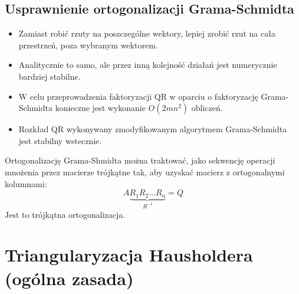 \documentclass[a4paper]{article}
\begin{document}
\subsection{Usprawnienie ortogonalizacji Grama-Schmidta}
\begin{itemize}
    \item Zamiast robić rzuty na poszczególne wektory, lepiej zrobić rzut na cała przestrzeń, poza wybranym wektorem.
    \item Analitycznie to samo, ale przez inną kolejność działań jest numerycznie bardziej stabilne.
    \item W celu przeprowadzenia faktoryzacji QR w oparciu o faktoryzację Grama-Schmidta konieczne jest wykonanie $O(2mn^2)$ obliczeń.
    \item Rozkład QR wykonywany zmodyfikowanym algorytmem Grama-Schmidta jest stabilny wstecznie.
\end{itemize}

Ortogonalizację Grama-Shmidta można traktować, jako sekwencję operacji mnożenia przez macierze trójkątne tak, aby uzyskać macierz z ortogonalnymi kolumnami:
\begin{equation*}
    A \underbrace{R_1R_2 \dots R_n}_{R^{-1}} = Q
\end{equation*}
Jest to trójkątna ortogonalizacja.

\section{Triangularyzacja Hausholdera (ogólna zasada)}
\end{document}
